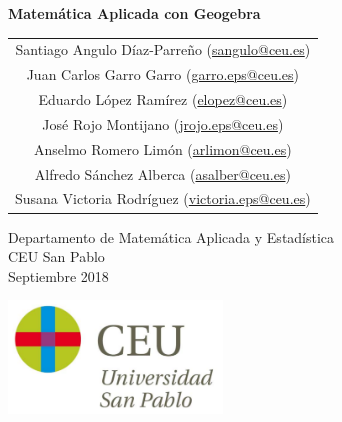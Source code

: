 \begin{titlepage}
\thispagestyle{empty}
\vspace*{7cm}
\par

\begin{center}
\normalfont\fontsize{30}{30}\selectfont
{\bfseries \color{blueceu}Matemática Aplicada con Geogebra}
\end{center}
\vspace{1cm}

\begin{center}
\Large
\begin{tabular}{c}
Santiago Angulo Díaz-Parreño (\url{sangulo@ceu.es})\\
Juan Carlos Garro Garro (\url{garro.eps@ceu.es})\\
Eduardo López Ramírez (\url{elopez@ceu.es})\\
José Rojo Montijano (\url{jrojo.eps@ceu.es})\\
Anselmo Romero Limón (\url{arlimon@ceu.es})\\
Alfredo Sánchez Alberca (\url{asalber@ceu.es})\\
Susana Victoria Rodríguez (\url{victoria.eps@ceu.es})
\end{tabular}

\medskip 
Departamento de Matemática Aplicada y Estadística\\ CEU San Pablo\\[1cm]
\medskip 
Septiembre 2018

\vspace{1cm}
\includegraphics[height=3cm]{img/logo_uspceu}
\end{center}
\vfill
\end{titlepage}